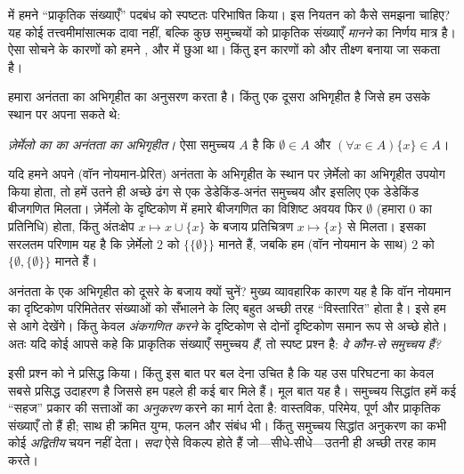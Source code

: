 \documentclass[../../../include/open-logic-section]{subfiles}
\begin{document}
	


 में हमने ``प्राकृतिक संख्याएँ'' पदबंध को
स्पष्टतः परिभाषित किया। इस नियतन को कैसे समझना चाहिए? यह कोई तत्त्वमीमांसात्मक
दावा नहीं, बल्कि कुछ समुच्चयों को प्राकृतिक संख्याएँ \emph{मानने} का निर्णय
मात्र है। ऐसा सोचने के कारणों को हमने ,
 और
 में छुआ था। किंतु इन कारणों को और
तीक्ष्ण बनाया जा सकता है।

हमारा अनंतता का अभिगृहीत \citet{VonNeumann1925} का अनुसरण करता है। किंतु
एक दूसरा अभिगृहीत है जिसे हम उसके स्थान पर अपना सकते थे:

\begin{defish}
\emph{ज़ेर्मेलो का \citeyear{Zermelo1908Untersuchungen} का अनंतता का
अभिगृहीत।} ऐसा समुच्चय $A$ है कि $\emptyset \in A$ और
$(\forall x \in A)\{x\} \in A$।
\end{defish}

यदि हमने अपने (वॉन नोयमान-प्रेरित) अनंतता के अभिगृहीत के स्थान पर ज़ेर्मेलो
का अभिगृहीत उपयोग किया होता, तो हमें उतने ही अच्छे ढंग से एक डेडेकिंड-अनंत
समुच्चय और इसलिए एक डेडेकिंड बीजगणित मिलता। ज़ेर्मेलो के दृष्टिकोण में हमारे
बीजगणित का विशिष्ट अवयव फिर $\emptyset$ (हमारा $0$ का प्रतिनिधि) होता, किंतु
अंतःक्षेप $x \mapsto x \cup \{x\}$ के बजाय प्रतिचित्रण
$x \mapsto \{x\}$ से मिलता। इसका सरलतम परिणाम यह है कि ज़ेर्मेलो $2$ को
$\{\{\emptyset\}\}$ मानते हैं, जबकि हम (वॉन नोयमान के साथ) $2$ को
$\{\emptyset, \{\emptyset\}\}$ मानते हैं।

अनंतता के एक अभिगृहीत को दूसरे के बजाय क्यों चुनें? मुख्य व्यावहारिक कारण
यह है कि वॉन नोयमान का दृष्टिकोण परिमितेतर संख्याओं को सँभालने के लिए बहुत
अच्छी तरह ``विस्तारित'' होता है। इसे हम  से आगे
देखेंगे। किंतु केवल \emph{अंकगणित करने} के दृष्टिकोण से दोनों दृष्टिकोण
समान रूप से अच्छे होते। अतः यदि कोई आपसे कहे कि प्राकृतिक संख्याएँ समुच्चय
\emph{हैं}, तो स्पष्ट प्रश्न है: \emph{वे कौन-से समुच्चय हैं?}

इसी प्रश्न को \citet{Benacerraf1965} ने प्रसिद्ध किया। किंतु इस बात पर बल
देना उचित है कि यह उस परिघटना का केवल सबसे प्रसिद्ध उदाहरण है जिससे हम पहले
ही कई बार मिले हैं। मूल बात यह है। समुच्चय सिद्धांत हमें कई ``सहज'' प्रकार
की सत्ताओं का \emph{अनुकरण} करने का मार्ग देता है: वास्तविक, परिमेय, पूर्ण
और प्राकृतिक संख्याएँ तो हैं ही; साथ ही क्रमित युग्म, फलन और संबंध भी। किंतु
समुच्चय सिद्धांत अनुकरण का कभी कोई \emph{अद्वितीय} चयन नहीं देता। \emph{सदा}
ऐसे विकल्प होते हैं जो---सीधे-सीधे---उतनी ही अच्छी तरह काम करते।
\end{document}
